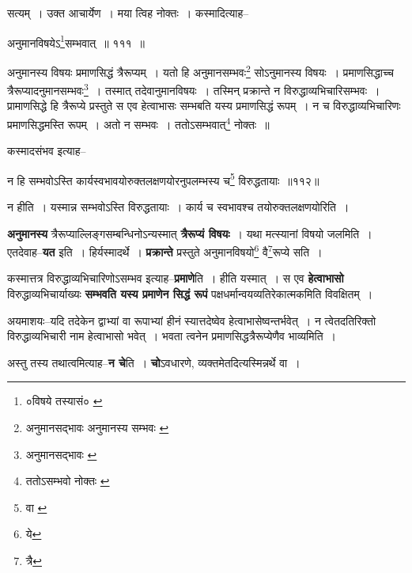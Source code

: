 \documentclass[article,12pt,a4paper]{memoir}
\begin{document}
	  \pstart सत्यम् । उक्त आचार्येण । मया त्विह नोक्तः । कस्मादित्याह--
	\pend
       
	  \bigskip
	  \begingroup
	

	  \pstart अनुमानविषयेऽ\footnote{०विषये तस्यासं० \cite{dp-msC}}\-सम्भवात् ॥ १११ ॥
	\pend
      
	  \endgroup
	 

	  \pstart अनुमानस्य विषयः प्रमाणसिद्धं त्रैरूप्यम् । यतो हि अनुमानसम्भवः\footnote{अनुमानसद्भावः \cite{dp-msA} \cite{dp-msB} \cite{dp-msC} \cite{dp-edP} \cite{dp-edH} \cite{dp-edN} अनुमानस्य सम्भवः \cite{dp-edE}} सोऽनुमानस्य विषयः । प्रमाणसिद्धाच्च त्रैरूप्यादनुमानसम्भवः\footnote{अनुमानसद्भावः \cite{dp-msA} \cite{dp-msB} \cite{dp-edP} \cite{dp-edH} \cite{dp-edN}} । तस्मात् तदेवानुमानविषयः । तस्मिन् प्रक्रान्ते न विरुद्धाव्यभिचारिसम्भवः । प्रामाणसिद्धे हि त्रैरूप्ये प्रस्तुते स एव हेत्वाभासः सम्भबति यस्य प्रमाणसिद्धं रूपम् । न च विरुद्धाव्यभिचारिणः प्रमाणसिद्धमस्ति रूपम् । अतो न सम्भवः । ततोऽसम्भवात्\footnote{ततोऽसम्भवो नोक्तः \cite{dp-msA} \cite{dp-msB} \cite{dp-edP} \cite{dp-edH}} नोक्तः ॥
	\pend
       

	  \pstart कस्मादसंभव इत्याह--
	\pend
       
	  \bigskip
	  \begingroup
	

	  \pstart न हि सम्भवोऽस्ति कार्यस्वभावयोरुक्तलक्षणयोरनुपलम्भस्य च\footnote{वा \cite{dp-msD}} विरुद्धतायाः ॥११२॥
	\pend
      
	  \endgroup
	 

	  \pstart न हीति । यस्मान्न सम्भवोऽस्ति विरुद्धतायाः । कार्य च स्वभावश्च तयोरुक्तलक्षणयोरिति ।
	\pend
      
	  \endgroup
	

	  \pstart \textbf{अनुमानस्य} त्रैरूप्याल्लिङ्गसम्बन्धिनोऽन्यस्मात् \textbf{त्रैरूप्यं विषयः} । यथा मत्स्यानां विषयो जलमिति । एतदेवाह--\textbf{यत} इति । हिर्यस्मादर्थे । \textbf{प्रक्रान्ते} प्रस्तुते अनुमानविषयो\footnote{ये} वै\footnote{त्रै}\-रूप्ये सति ।
	\pend
      

	  \pstart कस्मात्तत्र विरुद्धाव्यभिचारिणोऽसम्भव इत्याह--\textbf{प्रमाणे}ति । हीति यस्मात् । स एव \textbf{हेत्वाभासो} विरुद्धाव्यभिचार्याख्यः \textbf{सम्भवति यस्य प्रमाणेन सिद्धं रूपं} पक्षधर्मान्वयव्यतिरेकात्मकमिति विवक्षितम् ।
	\pend
      

	  \pstart अयमाशयः--यदि तदेकेन द्वाभ्यां वा रूपाभ्यां हीनं स्यात्तदेष्वेव हेत्वाभासेष्वन्तर्भवेत् । न त्वेतदतिरिक्तो विरुद्धाव्यभिचारी नाम हेत्वाभासो भवेत् । भवता त्वनेन प्रमाणसिद्धत्रैरूप्येणैव भाव्यमिति ।
	\pend
      

	  \pstart अस्तु तस्य तथात्वमित्याह--\textbf{न चे}ति । \textbf{चो}ऽवधारणे, व्यक्तमेतदित्यस्मिन्नर्थे वा ।
	\pend
      
\end{document}
